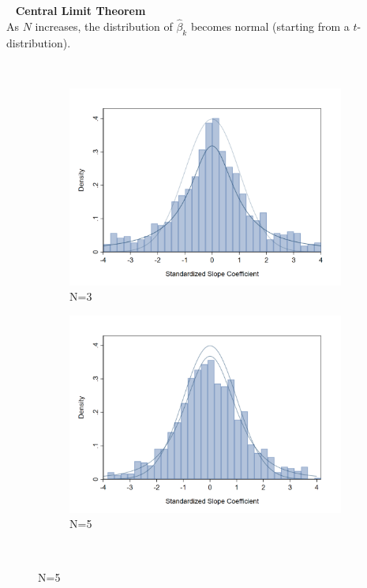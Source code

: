 \documentclass[a4paper,12pt]{article}
\begin{document}
%

\
\newpage
    \textbf{Central Limit Theorem}\\
    As $N$ increases, the distribution of $\hat{\beta}_k$ becomes normal (starting from a $t$-distribution).

\


    \begin{figure}[H]
        \begin{subfigure}[c]{0.49\textwidth}
            \centering
            \includegraphics[width=1\textwidth]{figures/sampling_error_beta1_3}
            \caption{N=3}
            \label{fig:sampling error beta1 N3}
        \end{subfigure}%
        \begin{subfigure}[c]{0.49\textwidth}
            \centering
            \includegraphics[width=1\textwidth]{figures/sampling_error_beta1_5}
            \caption{N=5}
            \label{fig:sampling error beta1 N5}								
        \end{subfigure}\\


\end{figure}
\end{document}
